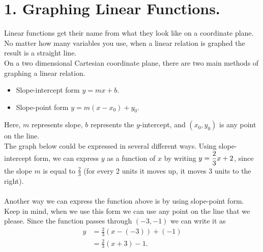 \documentclass[12pt,fleqn]{book}
\begin{document}
\chapter{1. Graphing Linear Functions.}
Linear functions get their name from what they look like on a coordinate plane.  No matter how many variables you use, when a linear relation is graphed the result is a straight line.
\\[1em]
On a two dimensional Cartesian coordinate plane, there are two main methods of graphing a linear relation.
\begin{itemize}
	\item Slope-intercept form $y=mx+b$.
	\item Slope-point form $y=m(x-x_0)+y_0$.
\end{itemize}
Here, $m$ represents slope, $b$ represents the $y$-intercept, and $(x_0,y_0)$ is any point on the line.
\\[1em]
The graph below could be expressed in several different ways.  Using slope-intercept form, we can express $y$ as a function of $x$ by writing $\displaystyle y=\frac 23 x +2$, since the slope $m$ is equal to $\frac 23$ (for every 2 units it moves up, it moves 3 units to the right).
\\[1em]
\\[1em]
Another way we can express the function above is by using slope-point form.  Keep in mind, when we use this form we can use any point on the line that we please.  Since the function passes through $(-3,-1)$ we can write it as
\begin{align*}
    y&=\frac 23 (x-(-3))+(-1)\\
    &=\frac 23 (x+3)-1.
\end{align*}
\end{document}
